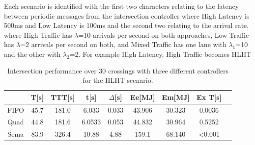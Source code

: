 Each scenario is identified with the first two characters relating to the latency between periodic messages from the intersection controller where High Latency is 500ms and  Low Latency is 100ms and the second two relating to the arrival rate, where High Traffic has $\lambda$=10 arrivals per second on both approaches, Low Traffic has $\lambda$=2 arrivals per second on both, and Mixed Traffic has one lane with $\lambda_1$=10 and the other with $\lambda_2$=2. For example High Latency, High Traffic becomes HLHT

\begin{table}
\begin{tabular}{|c|c|c|c|c|c|c|c|c|}
\hline
& T[s]&TTT[s]&t[s]&$\Delta$[s]&Ee[MJ]&Em[MJ]&Ex T[s]\\
\hline
FIFO & 45.7 & 181.0 & 6.033 & 0.033 & 43.906 & 30.323 & 0.0036\\
Quad & 44.8 &181.6& 6.0533 & 0.053 & 44.832 & 30.964 & 0.5252\\
Sema & 83.9 & 326.4 & 10.88 & 4.88 & 159.1 & 68.140 & <0.001\\
\hline
\end{tabular}
\label{tab:results}
\caption{Intersection performance over 30 crossings with three different controllers for the HLHT scenario. }
\end{table}

